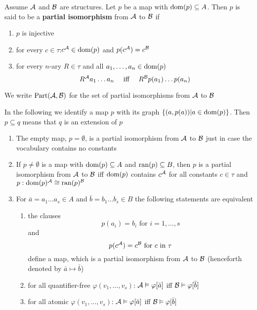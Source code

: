 \documentclass[11pt]{article}
\def \Part {\text{Part}}
\begin{document}
\begin{definition}[]
Assume \(\mathcal{A}\) and \(\mathcal{B}\) are structures. Let \(p\) be a map with
\(\operatorname{dom}(p)\subseteq A\). Then \(p\) is said to be a \textbf{partial isomorphism} from \(\mathcal{A}\)
to \(\mathcal{B}\) if
\begin{enumerate}
\item \(p\) is injective
\item for every \(c\in\tau\):\(c^{\mathcal{A}}\in\operatorname{dom}(p)\) and \(p(c^{\mathcal{A}})=c^{\mathcal{B}}\)
\item for every \(n\)-ary \(R\in\tau\) and all \(a_1,\dots,a_n\in\operatorname{dom}(p)\)
\begin{equation*}
R^{\mathcal{A}}a_1\dots a_n \quad\text{ iff }\quad
R^{\mathcal{B}}p(a_1)\dots p(a_n)
\end{equation*}
\end{enumerate}

We write \(\Part(\cala,\calb)\) for the set of partial isomorphisms from \(\mathcal{A}\) to \(\mathcal{B}\)
\end{definition}

In the following we identify a map \(p\) with its graph \(\{(a,p(a))|a\in\operatorname{dom}(p)\}\).
Then \(p\subseteq q\) means that \(q\) is an extension of \(p\)

\begin{remark}
\begin{enumerate}
\item The empty map, \(p=\emptyset\), is a partial isomorphism from \(\mathcal{A}\) to \(\mathcal{B}\) just in
case the vocabulary contains no constants
\item If \(p\neq\emptyset\) is a map with \(\operatorname{dom}(p)\subseteq A\) and \(\operatorname{ran}(p)\subseteq B\),
then \(p\) is a partial isomorphism from \(\mathcal{A}\) to \(\mathcal{B}\) iff \(\operatorname{dom}(p)\)
contains \(c^{\mathcal{A}}\) for all constants \(c\in\tau\) and \(p:\operatorname{dom}(p)^{\mathcal{A}}\cong\operatorname{ran}(p)^{\mathcal{B}}\)
\item For \(\bar{a}=a_1\dots a_s\in A\) and \(\bar{b}=b_1\dots b_s\in B\) the following statements
are equivalent
\begin{enumerate}
\item the clauses
\begin{equation*}
p(a_i)=b_i\text{ for }i=1,\dots,s
\end{equation*}
and
\begin{equation*}
p(c^{\mathcal{A}})=c^{\mathcal{B}}\text{ for }c\text{ in }\tau
\end{equation*}
define a map, which is a partial isomorphism from \(\mathcal{A}\) to \(\mathcal{B}\) (henceforth
denoted by \(\bar{a}\mapsto\bar{b}\))
\item for all quantifier-free \(\varphi(v_1,\dots,v_s)\):
\(\mathcal{A}\vDash\varphi[\bar{a}]\) iff
\(\mathcal{B}\vDash\varphi[\bar{b}]\)
\item for all atomic \(\varphi(v_1,\dots,v_s)\):
\(\mathcal{A}\vDash\varphi[\bar{a}]\) iff
\(\mathcal{B}\vDash\varphi[\bar{b}]\)
\end{enumerate}
\end{enumerate}
\end{remark}
\end{document}
